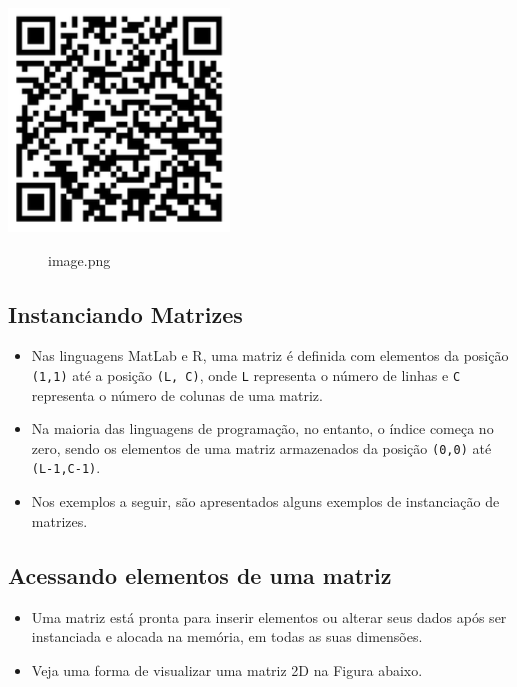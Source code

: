 \documentclass[12pt,a4paper]{article}
\providecommand{\tightlist}{%
      \setlength{\itemsep}{0pt}\setlength{\parskip}{0pt}}
\begin{document}
\includegraphics{"figs/image38.png"}

    \begin{figure}
\centering
\caption{image.png}
\end{figure}

    \hypertarget{instanciando-matrizes}{%
\subsection{Instanciando Matrizes}\label{instanciando-matrizes}}

    \begin{itemize}
\item
  Nas linguagens MatLab e R, uma matriz é definida com elementos da
  posição \texttt{(1,1)} até a posição \texttt{(L,\ C)}, onde \texttt{L}
  representa o número de linhas e \texttt{C} representa o número de
  colunas de uma matriz.
\item
  Na maioria das linguagens de programação, no entanto, o índice começa
  no zero, sendo os elementos de uma matriz armazenados da posição
  \texttt{(0,0)} até \texttt{(L-1,C-1)}.
\item
  Nos exemplos a seguir, são apresentados alguns exemplos de
  instanciação de matrizes.
\end{itemize}

    \hypertarget{acessando-elementos-de-uma-matriz}{%
\subsection{Acessando elementos de uma
matriz}\label{acessando-elementos-de-uma-matriz}}

    \begin{itemize}
\tightlist
\item
  Uma matriz está pronta para inserir elementos ou alterar seus dados
  após ser instanciada e alocada na memória, em todas as suas dimensões.
\item
  Veja uma forma de visualizar uma matriz 2D na Figura abaixo.
\end{itemize}
\end{document}

